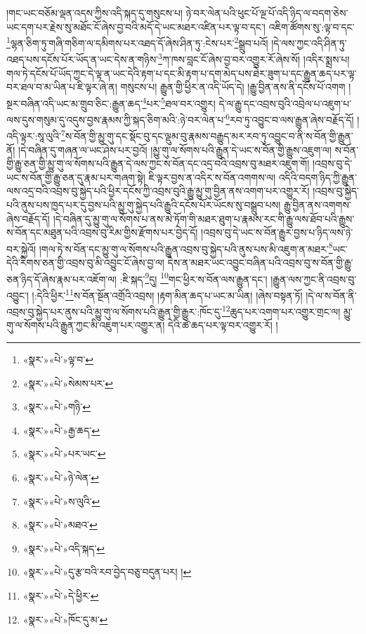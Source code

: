 །གང་ཡང་བཅོམ་ལྡན་འདས་ཀྱིས་འདི་སྐད་དུ་གསུངས་པ། ཉེ་བར་ལེན་པའི་ཕུང་པོ་ལྔ་པོ་འདི་ཉིད་ལ་བདག་ཅེས་ཡང་དག་པར་རྗེས་སུ་མཐོང་ངོ་ཞེས་བྱ་བའི་མདོ་དེ་ཡང་མཐར་འཛིན་པར་ལྟ་བ་དང་། འཇིག་ཚོགས་སུ་:ལྟ་བ་དང་\footnote{«སྣར་»«པེ་»ལྟ་བ་}ལྷན་ཅིག་ཏུ་གཞི་གཅིག་ལ་དམིགས་པར་འཐད་དོ་ཞེས་ཤིན་ཏུ་:ངེས་པར་\footnote{«སྣར་»«པེ་»སེམས་པར་}སྒྲུབ་པའོ། །དེ་ལས་ཀྱང་འདི་ཤིན་ཏུ་འཐད་པས་དངོས་པོར་ཡོད་ན་ཡང་དེས་ན་གཉིས་\footnote{«སྣར་»«པེ་»གཉི་}ཀ་ཁས་བླང་ངོ་ཞེས་བྱ་བར་འགྱུར་རོ་ཞེས་སོ། །འདིར་སྨྲས་པ། གལ་ཏེ་དངོས་པོ་ཡོད་ཀྱང་དེ་ལྟ་ན་ཡང་དེའི་རྟག་པ་དང་མི་རྟག་པ་དག་མེད་པས་ཐེར་ཟུག་པ་དང་རྒྱུན་ཆད་པར་ལྟ་བར་ཐལ་བ་མ་ཡིན་པ་ཇི་ལྟར་ཞེ་ན། གསུངས་པ། རྒྱུན་གྱི་ཕྱིར་ན་འདི་ཡོད་དེ། །རྒྱུ་བྱིན་ནས་ནི་དངོས་པོ་འགག །སྔར་བཞིན་འདི་ཡང་མ་གྲུབ་ཅིང་:རྒྱུན་ཆད་\footnote{«སྣར་»«པེ་»རྒྱ་ཆད་}པར་\footnote{«སྣར་»«པེ་»པར་ཡང་}ཐལ་བར་འགྱུར། དེ་ལ་རྒྱུ་དང་འབྲས་བུའི་འབྲེལ་པ་འཇུག་པ་ལས་དུས་གསུམ་དུ་འདུས་བྱས་རྣམས་ཀྱི་སྐད་ཅིག་མའི་:ཉེ་བར་ལེན་པ་\footnote{«སྣར་»«པེ་»ཉེ་ལེན་}རབ་ཏུ་འབྱུང་བ་ལས་རྒྱུན་ཞེས་བརྗོད་དོ། །འདི་ལྟར་:སཱ་ལུའི་\footnote{«སྣར་»«པེ་»ས་ལུའི་}ས་བོན་གྱི་མྱུ་གུ་དང་སྡོང་བུ་དང་ལྡུམ་བུ་རྣམས་བརྒྱུད་མར་རབ་ཏུ་འབྱུང་བ་ནི་ས་བོན་གྱི་རྒྱུན་ནོ། །དེ་བཞིན་དུ་གཞན་ལ་ཡང་ཤེས་པར་བྱའོ། །མྱུ་གུ་ལ་སོགས་པའི་རྒྱུན་དེ་ཡང་ས་བོན་གྱི་རྒྱུས་འཇུག་ལ། ས་བོན་གྱི་རྒྱུ་ཅན་གྱི་མྱུ་གུ་ལ་སོགས་པའི་རྒྱུན་དེ་ལས་ཀྱང་ས་བོན་དང་འདྲ་བའི་འབྲས་བུ་མཐར་འཇུག་གོ། །འབྲས་བུ་དེ་ཡང་ས་བོན་གྱི་རྒྱུ་ཅན་དུ་རྣམ་པར་གཞག་སྟེ། ཇི་ལྟར་བྱས་ན་འདིར་ས་བོན་འགགས་ལ། འདིའི་བདག་ཉིད་ཀྱི་རྒྱུན་ལས་འདྲ་བའི་འབྲས་བུ་སྐྱེད་པའི་ཕྱིར་དངོས་ཀྱི་འབྲས་བུའི་རྒྱུ་མྱུ་གུ་བྱིན་ནས་འགག་པར་འགྱུར་རོ། །འབྲས་བུ་སྐྱེད་པའི་ནུས་པས་ཁྱད་པར་དུ་བྱས་པའི་མྱུ་གུ་སྐྱེད་པའི་རྒྱུའི་དངོས་པོར་ཡོངས་སུ་བསྒྲུབ་པས། རྒྱུ་བྱིན་ནས་འགགས་ཞེས་བརྗོད་དོ། །དེ་བཞིན་དུ་མྱུ་གུ་ལ་སོགས་པ་ནས་མེ་ཏོག་གི་མཐར་ཐུག་པ་རྣམས་རང་གི་རྒྱུ་ལས་ཐོབ་པའི་རྒྱུས་ས་བོན་དང་མཐུན་པའི་འབྲས་བུ་རིམ་གྱིས་རྫོགས་པར་བྱེད་དོ། །འབྲས་བུ་དེ་ཡང་ས་བོན་རྒྱུར་བྱས་པ་ཉིད་ལས་ཉེ་བར་སྐྱེའོ། །གལ་ཏེ་ས་བོན་དང་མྱུ་གུ་ལ་སོགས་པའི་རྒྱུན་འབྲས་བུ་སྐྱེད་པའི་ནུས་པས་མི་འཇུག་ན་མཐར་\footnote{«སྣར་»«པེ་»མཐའ་}ཡང་དེའི་རིགས་ཅན་གྱི་འབྲས་བུ་མི་འབྱུང་ངོ་ཞེས་བྱ་ལ། དེས་ན་མཐར་ཡང་འབྱུང་བཞིན་པའི་འབྲས་བུ་ས་བོན་གྱི་རྒྱུ་ཅན་ཉིད་དོ་ཞེས་རྣམ་པར་འཇོག་ལ། :ཇི་སྐད་\footnote{«སྣར་»«པེ་»འདི་སྐད་}དུ། \footnote{«སྣར་»«པེ་»དུ་རྩ་བའི་རབ་བྱེད་བཅུ་བདུན་པར། ། }གང་ཕྱིར་ས་བོན་ལས་རྒྱུན་དང་། །རྒྱུན་ལས་ཀྱང་ནི་འབྲས་བུ་འབྱུང་། །:དེའི་ཕྱིར་\footnote{«སྣར་»«པེ་»དེ་ཕྱིར་}ས་བོན་སྔོན་འགྲོའི་འབྲས། །རྟག་མིན་ཆད་པ་ཡང་མ་ཡིན། །ཞེས་བསྟན་ཏོ། །དེ་ལ་ས་བོན་ནི་འབྲས་བུ་སྐྱེད་པར་ནུས་པའི་མྱུ་གུ་ལ་སོགས་པའི་རྒྱུན་གྱི་རྒྱུར་:ཁོང་དུ་\footnote{«སྣར་»«པེ་»ཁོང་དུ་མ་}ཆུད་པར་འགག་པར་འགྱུར་གྲང་ལ། མྱུ་གུ་ལ་སོགས་པའི་རྒྱུན་ཀྱང་མི་འཇུག་པར་འགྱུར་ན། དེའི་ཚེ་ཆད་པར་ལྟ་བར་འགྱུར་རོ། །
